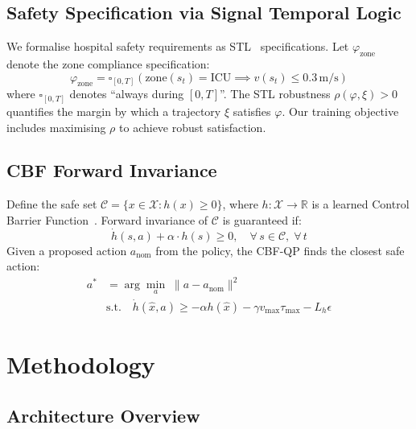 \documentclass[10pt,twocolumn]{article}
\begin{document}
\subsection{Safety Specification via Signal Temporal Logic}
We formalise hospital safety requirements as STL~\cite{donze2010stl, li2017stl_rl} specifications.
Let $\varphi_\text{zone}$ denote the zone compliance specification:
\begin{equation}
\label{eq:stl}
\varphi_\text{zone} = \square_{[0,T]} \left( \text{zone}(s_t) = \text{ICU} \implies v(s_t) \leq 0.3\,\text{m/s} \right)
\end{equation}
where $\square_{[0,T]}$ denotes ``always during $[0,T]$''.
The STL robustness $\rho(\varphi, \xi) > 0$ quantifies the margin by which a trajectory $\xi$ satisfies $\varphi$.
Our training objective includes maximising $\rho$ to achieve robust satisfaction.

\subsection{CBF Forward Invariance}
Define the safe set $\mathcal{C} = \{x \in \mathcal{X} : h(x) \geq 0\}$, where $h : \mathcal{X} \to \mathbb{R}$ is a learned Control Barrier Function~\cite{ames2017cbf}.
Forward invariance of $\mathcal{C}$ is guaranteed if:
\begin{equation}
\label{eq:cbf}
\dot{h}(s,a) + \alpha \cdot h(s) \geq 0, \quad \forall\, s \in \mathcal{C}, \; \forall\, t
\end{equation}
Given a proposed action $a_\text{nom}$ from the policy, the CBF-QP finds the closest safe action:
\begin{equation}
\label{eq:qp}
\begin{aligned}
a^* &= \arg\min_{a} \; \|a - a_\text{nom}\|^2 \\
&\text{s.t.} \quad \dot{h}(\hat{x}, a) \ge -\alpha h(\hat{x}) - \gamma v_{\max}\tau_{\max} - L_h \epsilon
\end{aligned}
\end{equation}

\section{Methodology}
\label{sec:method}

\subsection{Architecture Overview}
\end{document}
